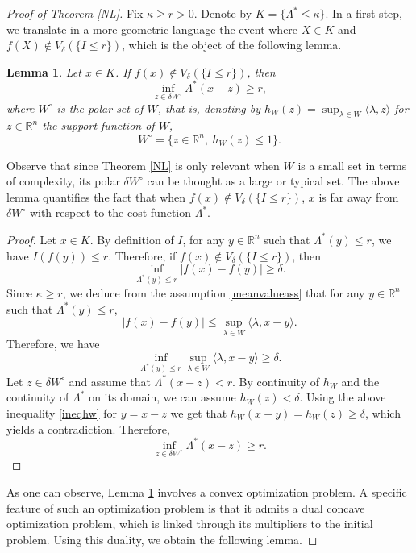 \documentclass[aop,preprint]{imsart}
\newcommand\RR{\mathbb{R}}
\numberwithin{equation}{section}
\theoremstyle{definition}
\theoremstyle{plain}
\newtheorem{lemma}[Def]{Lemma}
\theoremstyle{remark}
\begin{document}
\begin{proof}[Proof of Theorem \ref{NL}]
Fix $\kappa\geq  r>0$. Denote by $ K =\{ \Lambda^* \leq \kappa \}$.
In a first step, we translate in a more geometric language the event where $X \in K $ and $f(X) \notin V_\delta(\{I\leq r\})$, which is the object of the following lemma.
\begin{lemma}\label{lemmdet}Let $x \in K$. If $f(x) \notin V_\delta(\{ I \leq r\})$, then
$$ \inf_{ z \in \delta W^{\circ}} \Lambda^*(x-z) \geq r,$$
where $W^{\circ}$ is the polar set of $W$, that is, denoting by $h_W(z) = \sup_{\lambda \in W}\langle \lambda, z \rangle$ for $z \in \RR^n$ the support function of $W$,
$$W^{\circ} = \big\{z \in \RR^n, \ h_W(z)\leq  1\big\}.$$
\end{lemma}
Observe that since Theorem \ref{NL} is only relevant when $W$ is a small set in terms of complexity, its polar $\delta W^\circ$ can be thought as a large or typical set. The above lemma quantifies the fact that when $f(x) \notin V_\delta (\{ I\leq r\})$, $x$ is far away from $\delta W^\circ$ with respect to the cost function $\Lambda^*$.
\begin{proof}Let $x\in K$. By definition of $I$, for any $y\in \RR^n$ such that $\Lambda^*(y) \leq r$, we have $I(f(y)) \leq r$. Therefore, if $f(x) \notin V_{\delta}(\{I\leq r\})$, then
$$  \inf_{\Lambda^*(y) \leq r} |f(x) - f(y)| \geq \delta.$$
Since $\kappa \geq r$, we deduce from the assumption \eqref{meanvalueass} that  for any $y \in \RR^n$ such that $\Lambda^*(y) \leq r$,
$$ |f(x) - f(y)|\leq \sup_{\lambda \in W} \langle \lambda, x-y\rangle.$$
Therefore, we have 
\begin{equation} \label{ineqhw} \inf_{\Lambda^*(y) \leq r} \sup_{\lambda \in W} \langle \lambda, x-y \rangle\geq \delta.\end{equation}
Let $z \in \delta W^\circ$ and assume that $\Lambda^*(x-z) <r$. By continuity of $h_W$ and the continuity of  $\Lambda^*$ on its domain, we can assume $h_W(z)<\delta$. Using the above inequality \eqref{ineqhw} for $y =x -z$ we get that $h_W(x-y) = h_W(z) \geq \delta$, which yields a contradiction. Therefore,
$$ \inf_{ z \in \delta W^\circ} \Lambda^*(x-z) \geq r.$$
 \end{proof}
As one can observe, Lemma \ref{lemmdet} involves a convex optimization problem. A specific feature of such an optimization problem is that it admits a dual concave optimization problem, which is linked through its multipliers to the initial problem. Using this duality, we obtain the following lemma.


\end{proof}
\end{document}
